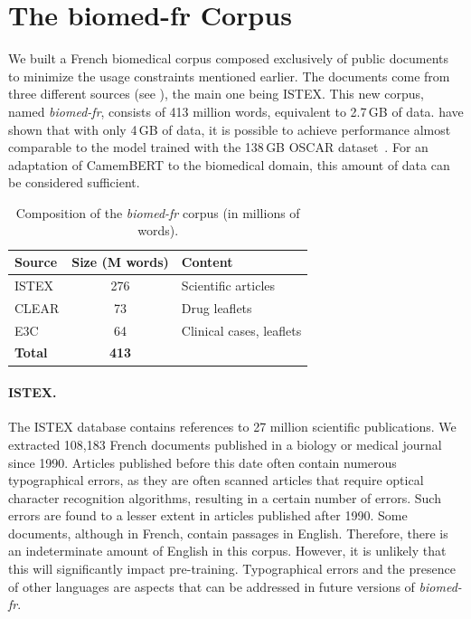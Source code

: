 \section{The biomed-fr Corpus}
\label{sec:biomed-fr}

\begin{reviewread}
We built a French biomedical corpus composed exclusively of public documents to minimize the usage constraints mentioned earlier. The documents come from three different sources (see ), the main one being ISTEX. This new corpus, named \textit{biomed-fr}, consists of 413 million words, equivalent to 2.7\,GB of data. \citet{martin-etal-2020-camembert} have shown that with only 4\,GB of data, it is possible to achieve performance almost comparable to the model trained with the 138\,GB OSCAR dataset~\citep{OrtizSuarezSagotRomary2019}. For an adaptation of CamemBERT to the biomedical domain, this amount of data can be considered sufficient.
\end{reviewread}

\begin{table}[t]
\centering
\small
\begin{tabular}{l S[table-format=3] l}
\toprule
\textbf{Source} & {\textbf{Size (M words)}} & \textbf{Content} \\
\midrule
ISTEX & 276 & Scientific articles \\
CLEAR & 73 & Drug leaflets \\
E3C   & 64 & Clinical cases, leaflets \\
\midrule
\textbf{Total} & \textbf{413} & \\
\bottomrule
\end{tabular}
\caption{Composition of the \textit{biomed-fr} corpus (in millions of words).}
\label{tab:biomed-fr-composition}
\end{table}

\paragraph{ISTEX.} The ISTEX database contains references to 27 million scientific publications. We extracted 108,183 French documents published in a biology or medical journal since 1990. Articles published before this date often contain numerous typographical errors, as they are often scanned articles that require optical character recognition algorithms, resulting in a certain number of errors. Such errors are found to a lesser extent in articles published after 1990. Some documents, although in French, contain passages in English. Therefore, there is an indeterminate amount of English in this corpus. However, it is unlikely that this will significantly impact pre-training. Typographical errors and the presence of other languages are aspects that can be addressed in future versions of \textit{biomed-fr}.

